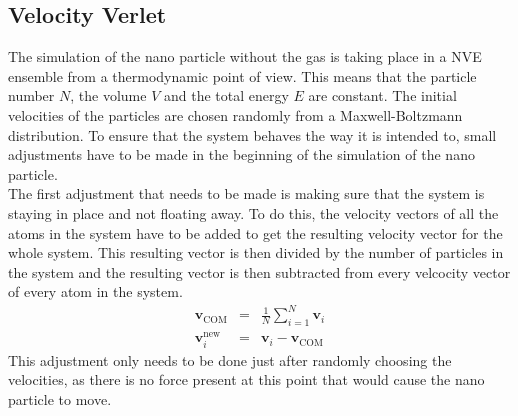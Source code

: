 \documentclass[12pt]{article}
\begin{document}
\subsection{Velocity Verlet}
The simulation of the nano particle without the gas is taking place in a NVE ensemble from a thermodynamic point of view. 
This means that the particle number $N$, the volume $V$ and the total energy $E$ are constant. 
The initial velocities of the particles are chosen randomly from a Maxwell-Boltzmann distribution. To ensure that the system behaves the way it is
intended to, small adjustments have to be made in the beginning of the simulation of the nano particle.\\
The first adjustment that needs to be made is making sure that the system is staying in place and not floating away. To do this, the velocity vectors
of all the atoms in the system have to be added to get the resulting velocity vector for the whole system. 
This resulting vector is then divided by the number of particles in the system and the resulting vector is then subtracted from every
velcocity vector of every atom in the system. 
\begin{eqnarray}
    \mathbf{v}_\text{COM} &=& \frac1N\sum_{i=1}^N \mathbf{v}_i\\
    \mathbf{v}_i^\text{new} &=& \mathbf{v}_i - \mathbf{v}_\text{COM}
\end{eqnarray}
This adjustment only needs to be done just after randomly choosing the velocities, as there is no force present at this point that would cause the
nano particle to move.
\end{document}
